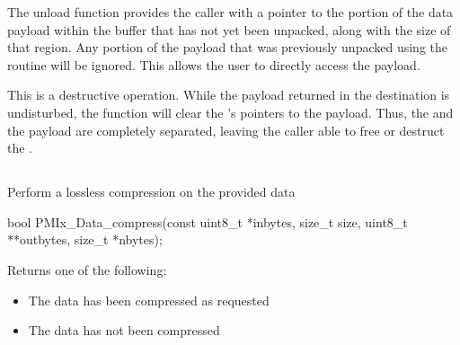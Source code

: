 \descr

The unload function provides the caller with a pointer to the
portion of the data payload within the buffer that has not yet been
unpacked, along with the size of that region. Any portion of
the payload that was previously unpacked using the 
routine will be ignored. This allows the user to directly access the payload.

\adviceuserstart
This is a destructive operation. While the payload returned in the
destination  is
undisturbed, the function will clear the 's pointers to the
payload. Thus, the  and the payload are completely separated,
leaving the caller able to free or destruct the .
\adviceuserend



\subsection{}

\summary

Perform a lossless compression on the provided data

\format

\cspecificstart
\begin{codepar}
bool
PMIx_Data_compress(const uint8_t *inbytes, size_t size,
                   uint8_t **outbytes, size_t *nbytes);
\end{codepar}
\cspecificend

\begin{arglist}
\end{arglist}

Returns one of the following:
\begin{itemize}
\item {} The data has been compressed as requested
\item {} The data has not been compressed
\end{itemize}

\descr

